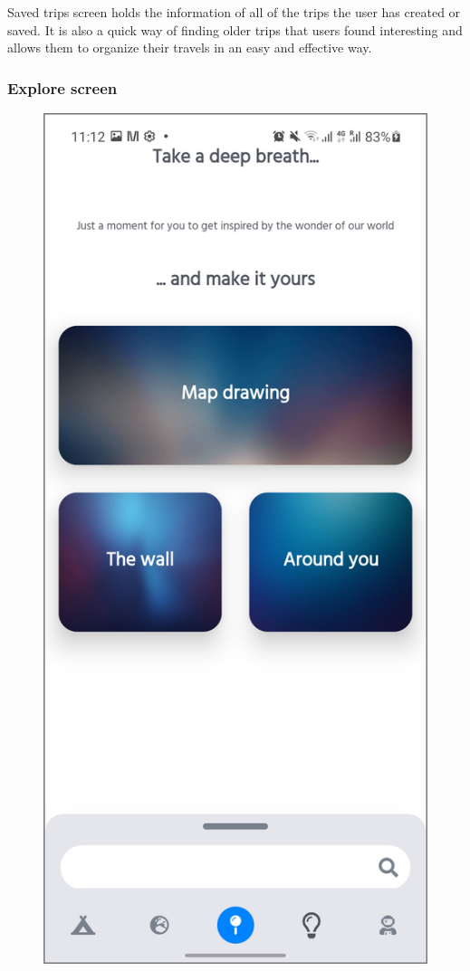 Saved trips screen holds the information of all of the trips the user has created or saved. It is also a quick way of finding older trips that users found interesting and allows them to organize their travels in an easy and effective way.
 
\newpage
\subsubsection{Explore screen}
\begin{figure}[!htb]
\centering
\begin{minipage}{.48\textwidth}
\centering
\includegraphics[width=.9\textwidth]{../Images/UI/ExploreLight.jpg}

\end{minipage}
\end{figure}
